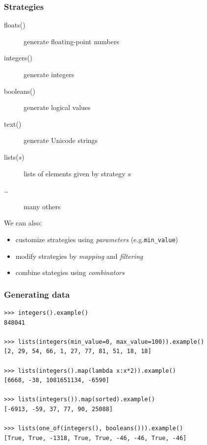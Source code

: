 \documentclass{beamer}
\begin{document}
\begin{frame}
  \frametitle{Strategies}

  \begin{description}
    \item[floats()] generate floating-point numbers
  \item[integers()] generate integers
  \item[booleans()] generate logical values 
  \item[text()] generate Unicode strings
  \item[lists($s$)] lists of elements given by strategy $s$
    \item[\ldots] many others
  \end{description}
  \bigskip
  
  We can also:
  \begin{itemize}
  \item customize strategies using \emph{parameters} (e.g.\@ \texttt{min\_value})
  \item modify strategies by \emph{mapping} and \emph{filtering}
  \item combine stategies using \emph{combinators}
  \end{itemize} 
\end{frame}


\begin{frame}[fragile]
  \frametitle{Generating data}

\begin{verbatim}
>>> integers().example()
848041

>>> lists(integers(min_value=0, max_value=100)).example()
[2, 29, 54, 66, 1, 27, 77, 81, 51, 18, 18]

>>> lists(integers().map(lambda x:x*2)).example()
[6668, -38, 1081651134, -6590]

>>> lists(integers()).map(sorted).example()
[-6913, -59, 37, 77, 90, 25088]

>>> lists(one_of(integers(), booleans())).example()
[True, True, -1318, True, True, -46, -46, True, -46]
\end{verbatim}
\end{frame}
\end{document}
